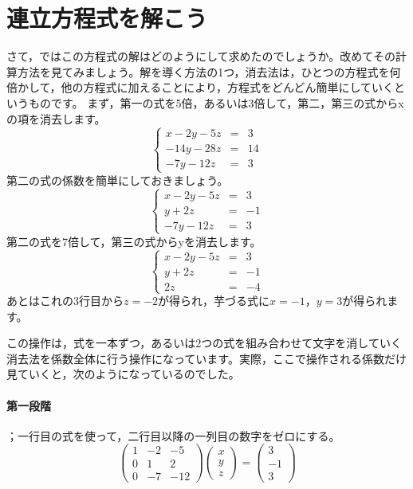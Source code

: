 \documentclass{ltjsbook}
\begin{document}
\section{連立方程式を解こう}
\label{ElementaryTransformation}
さて，ではこの方程式の解はどのようにして求めたのでしょうか。改めてその計算方法を見てみましょう。解を導く方法の1つ，消去法は，ひとつの方程式を何倍かして，他の方程式に加えることにより，方程式をどんどん簡単にしていくというものです。
まず，第一の式を5倍，あるいは3倍して，第二，第三の式からxの項を消去します。
\[ \left \{
	\begin{array}{rcl}
		x-2y-5z  & = & 3  \\
		-14y-28z & = & 14 \\
		-7y-12z  & = & 3
	\end{array}
	\right .
\]
第二の式の係数を簡単にしておきましょう。
\[ \left \{
	\begin{array}{rcl}
		x-2y-5z & = & 3  \\
		y+2z    & = & -1 \\
		-7y-12z & = & 3
	\end{array}
	\right .
\]
第二の式を7倍して，第三の式からyを消去します。
\[ \left \{
	\begin{array}{rcl}
		x-2y-5z & = & 3  \\
		y+2z    & = & -1 \\
		2z      & = & -4
	\end{array}
	\right .
\]
あとはこれの3行目から$z=-2$が得られ，芋づる式に$x=-1$，$y=3$が得られます。


この操作は，式を一本ずつ，あるいは2つの式を組み合わせて文字を消していく消去法を係数全体に行う操作になっています。実際，ここで操作される係数だけ見ていくと，次のようになっているのでした。

\paragraph{第一段階}；一行目の式を使って，二行目以降の一列目の数字をゼロにする。
\[
	\begin{pmatrix} 1 & -2 & -5  \\
                0 & 1  & 2   \\
                0 & -7 & -12\end{pmatrix}
	\begin{pmatrix} x \\ y \\ z \end{pmatrix}
	=
	\begin{pmatrix} 3 \\ -1 \\ 3 \end{pmatrix}
\]
\end{document}
